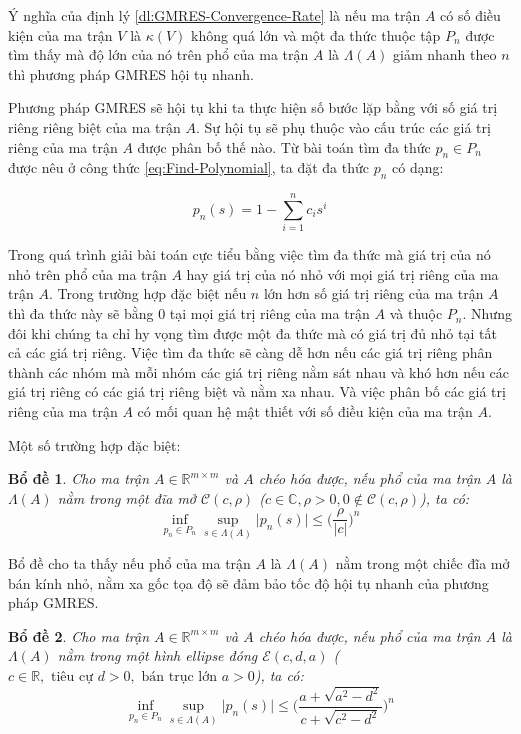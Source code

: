 \documentclass[14pt, a4paper]{article}
\numberwithin{equation}{section}
\numberwithin{algorithm}{section}
\numberwithin{figure}{section}
\newtheorem{bd}{Bổ đề}
\numberwithin{dl}{section}
\numberwithin{md}{section}
\numberwithin{bd}{section}
\numberwithin{dn}{section}
\numberwithin{hq}{section}
\begin{document}
Ý nghĩa của định lý \ref{dl:GMRES-Convergence-Rate} là nếu ma trận $A$ có số điều kiện của ma trận $V$ là $\kappa(V)$ không quá lớn và một đa thức thuộc tập $P_n$ được tìm thấy mà độ lớn của nó trên phổ của ma trận $A$ là $\Lambda(A)$ giảm nhanh theo $n$ thì phương pháp GMRES hội tụ nhanh.

Phương pháp GMRES sẽ hội tụ khi ta thực hiện số bước lặp bằng với số giá trị riêng riêng biệt của ma trận $A$. Sự hội tụ sẽ phụ thuộc vào cấu trúc các giá trị riêng của ma trận $A$ được phân bố thế nào.
Từ bài toán tìm đa thức $p_n \in P_n$ được nêu ở công thức \ref{eq:Find-Polynomial}, ta đặt đa thức $p_n$ có dạng:

\begin{equation}
    p_n(s) = 1 - \sum_{i=1}^n c_i s^i
\end{equation}

Trong quá trình giải bài toán cực tiểu bằng việc tìm đa thức mà giá trị của nó nhỏ trên phổ của ma trận $A$ hay giá trị của nó nhỏ với mọi giá trị riêng của ma trận $A$. Trong trường hợp đặc biệt nếu $n$ lớn hơn số giá trị riêng của ma trận $A$ thì đa thức này sẽ bằng 0 tại mọi giá trị riêng của ma trận $A$ và thuộc $P_n$.
Nhưng đôi khi chúng ta chỉ hy vọng tìm được một đa thức mà có giá trị đủ nhỏ tại tất cả các giá trị riêng. Việc tìm đa thức sẽ càng dễ hơn nếu các giá trị riêng phân thành các nhóm mà mỗi nhóm các giá trị riêng nằm sát nhau và khó hơn nếu các giá trị riêng có các giá trị riêng biệt và nằm xa nhau. Và việc phân bố các giá trị riêng của ma trận $A$ có mối quan hệ mật thiết với số điều kiện của ma trận $A$.

Một số trường hợp đặc biệt:

\begin{bd}
    Cho ma trận $A \in \mathbb{R}^{m \times m}$ và $A$ chéo hóa được, nếu phổ của ma trận $A$ là $\Lambda(A)$ nằm trong một đĩa mở $\mathcal{C}(c, \rho)$ ($c \in \mathbb{C}, \rho > 0, 0 \notin \mathcal{C}(c, \rho)$), ta có:
    \begin{equation}
        \inf_{p_n \in P_n} \sup_{s \in \Lambda(A)} \lvert p_n(s) \rvert \leq \Big( \dfrac{\rho}{\lvert c \rvert} \Big)^n
    \end{equation}
\end{bd}

Bổ đề cho ta thấy nếu phổ của ma trận $A$ là $\Lambda(A)$ nằm trong một chiếc đĩa mở bán kính nhỏ, nằm xa gốc tọa độ sẽ đảm bảo tốc độ hội tụ nhanh của phương pháp GMRES.

\begin{bd}
    Cho ma trận $A \in \mathbb{R}^{m \times m}$ và $A$ chéo hóa được, nếu phổ của ma trận $A$ là $\Lambda(A)$ nằm trong một hình ellipse đóng $\mathcal{E}(c, d, a)$ ($c \in \mathbb{R}, \text{ tiêu cự } d > 0, \text{ bán trục lớn } a > 0$), ta có:
    \begin{equation}
        \inf_{p_n \in P_n} \sup_{s \in \Lambda(A)} \lvert p_n(s) \rvert \leq \Big( \dfrac{a + \sqrt{a^2 - d^2}}{c + \sqrt{c^2 - d^2}} \Big)^n
    \end{equation}
\end{bd}
\end{document}
